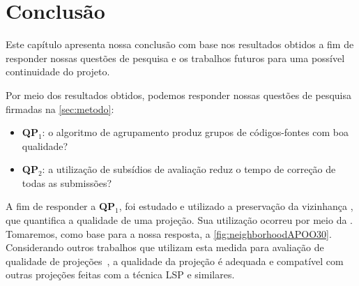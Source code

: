 \chapter{Conclusão}
\label{chap:Conclusao}

	Este capítulo apresenta nossa conclusão com base nos resultados obtidos a fim de
	responder nossas questões de pesquisa e os trabalhos futuros para uma possível
	continuidade do projeto.
	
	Por meio dos resultados obtidos, podemos responder nossas questões de pesquisa
	firmadas na \cref{sec:metodo}:
	
	\begin{itemize}
		\item \textbf{QP$_1$}: o algoritmo de agrupamento produz grupos de códigos-fontes
		com boa qualidade?
		\item \textbf{QP$_2$}: a utilização de subsídios de avaliação reduz o tempo
		de correção de todas as submissões?
	\end{itemize}
	
	A fim de responder a \textbf{QP$_1$}, foi estudado e utilizado a preservação
	da vizinhança \cite{paulovich2008hipp}, que quantifica a qualidade de uma projeção.
	Sua utilização ocorreu por meio da . Tomaremos, como base
	para a nossa resposta, a \cref{fig:neighborhoodAPOO30}.
	Considerando outros trabalhos que utilizam esta medida para avaliação de qualidade
	de projeções~\cite{phd:paulovich},
	a qualidade da projeção é adequada e compatível com outras projeções feitas com a técnica LSP e similares.
	
